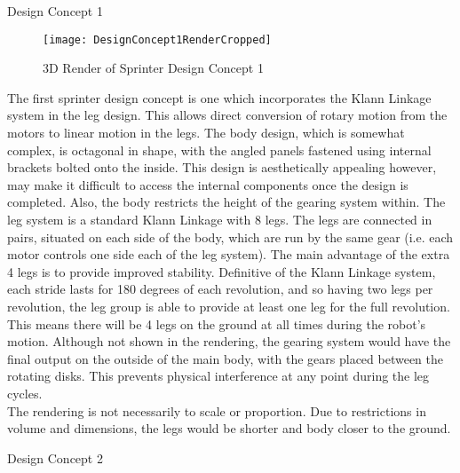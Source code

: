 \begin{homeworkProblem}
\begin{homeworkSection}{Design Concept 1}

\begin{figure}[H]
\label{3dConcept1}
  \begin{center}
    \texttt{[image: DesignConcept1RenderCropped]}
    \caption{3D Render of Sprinter Design Concept 1}
  \end{center}
\end{figure}

The first sprinter design concept is one which incorporates the Klann Linkage system in the leg design. This allows direct conversion of rotary motion from the motors to linear motion in the legs. The body design, which is somewhat complex, is octagonal in shape, with the angled panels fastened using internal brackets bolted onto the inside. This design is aesthetically appealing however, may make it difficult to access the internal components once the design is completed.  Also, the body restricts the height of the gearing system within. The leg system is a standard Klann Linkage with 8 legs. The legs are connected in pairs, situated on each side of the body, which are run by the same gear (i.e. each motor controls one side each of the leg system).  The main advantage of the extra 4 legs is to provide improved stability. Definitive of the Klann Linkage system, each stride lasts for 180 degrees of each revolution, and so having two legs per revolution, the leg group is able to provide at least one leg for the full revolution. This means there will be 4 legs on the ground at all times during the robot's motion. Although not shown in the rendering, the gearing system would have the final output on the outside of the main body, with the gears placed between the rotating disks. This prevents physical interference at any point during the leg cycles.\\

The rendering is not necessarily to scale or proportion.  Due to restrictions in volume and dimensions, the legs would be shorter and body closer to the ground.
\end{homeworkSection}

\begin{homeworkSection}{Design Concept 2}


\end{homeworkSection}
\end{homeworkProblem}

